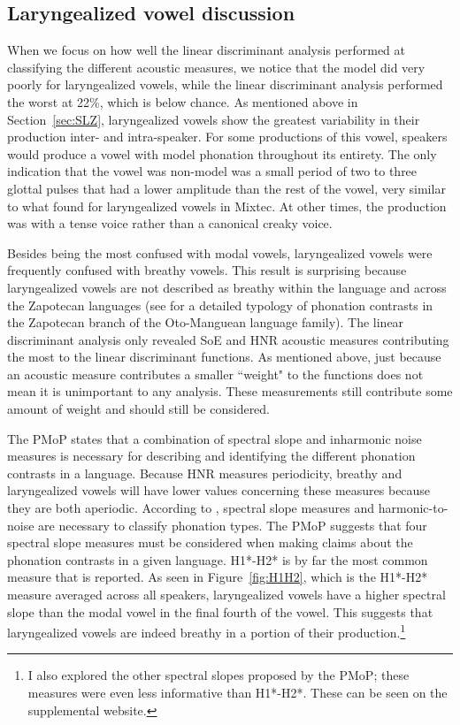 \documentclass[12pt, letterpaper]{article}
\begin{document}
\subsection{Laryngealized vowel discussion} \label{sec:DiscussionLaryngealized}

When we focus on how well the linear discriminant analysis performed at classifying the different acoustic measures, we notice that the model did very poorly for laryngealized vowels, while the linear discriminant analysis performed the worst at 22\%, which is below chance. As mentioned above in Section~\ref{sec:SLZ}, laryngealized vowels show the greatest variability in their production inter- and intra-speaker. For some productions of this vowel, speakers would produce a vowel with model phonation throughout its entirety. The only indication that the vowel was non-model was a small period of two to three glottal pulses that had a lower amplitude than the rest of the vowel, very similar to what \citet{gerfenProductionPerceptionLaryngealized2005} found for laryngealized vowels in Mixtec. At other times, the production was with a tense voice rather than a canonical creaky voice. 

Besides being the most confused with modal vowels, laryngealized vowels were frequently confused with breathy vowels. This result is surprising because laryngealized vowels are not described as breathy within the language and across the Zapotecan languages (see \cite{ariza-garciaPhonationTypesTones2018} for a detailed typology of phonation contrasts in the Zapotecan branch of the Oto-Manguean language family). The linear discriminant analysis only revealed SoE and HNR acoustic measures contributing the most to the linear discriminant functions. As mentioned above, just because an acoustic measure contributes a smaller ``weight" to the functions does not mean it is unimportant to any analysis. These measurements still contribute some amount of weight and should still be considered. 

The PMoP states that a combination of spectral slope and inharmonic noise measures is necessary for describing and identifying the different phonation contrasts in a language. Because HNR measures periodicity, breathy and laryngealized vowels will have lower values concerning these measures because they are both aperiodic. According to \citet{garellekPhoneticsVoice2019}, spectral slope measures and harmonic-to-noise are necessary to classify phonation types. The PMoP suggests that four spectral slope measures must be considered when making claims about the phonation contrasts in a given language. H1*-H2* is by far the most common measure that is reported. As seen in Figure~\ref{fig:H1H2}, which is the H1*-H2* measure averaged across all speakers, laryngealized vowels have a higher spectral slope than the modal vowel in the final fourth of the vowel. This suggests that laryngealized vowels are indeed breathy in a portion of their production.\footnote{I also explored the other spectral slopes proposed by the PMoP; these measures were even less informative than H1*-H2*. These can be seen on the supplemental website. } 
\end{document}
